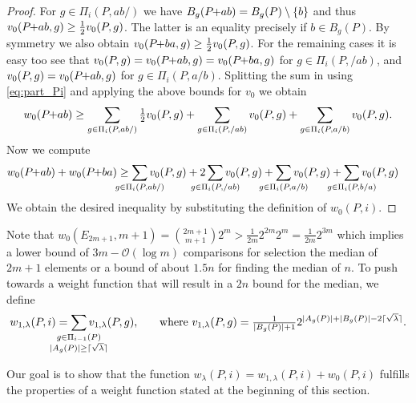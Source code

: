 \documentclass[a4paper,UKenglish,cleveref, autoref, thm-restate]{lipics-v2021}
\newcommand{\pchild}[3]{{#1}\kern-1pt{+}{#2}{#3}}
\begin{document}
\begin{proof}
  For $g \in \Pi_i(P,ab/)$ we have $B_g(\pchild{P}{a}{b}) = B_g(P) \setminus \{ b \}$ and thus $v_0(\pchild{P}{a}{b}, g) \ge \tfrac12 v_0(P, g)$.
  The latter is an equality precisely if $b \in B_g(P)$.
  By symmetry we also obtain $v_0(\pchild{P}{b}{a}, g) \ge \tfrac12 v_0(P, g)$.
  For the remaining cases it is easy too see that $v_0(P, g) = v_0(\pchild{P}{a}{b}, g) = v_0(\pchild{P}{b}{a}, g)$ for $g \in \Pi_i(P,/ab)$, and $v_0(P, g) = v_0(\pchild{P}{a}{b}, g)$ for $g \in \Pi_i(P, a/b)$.
Splitting the sum in  using \cref{eq:part_Pi} and applying the above bounds for $v_0$ we obtain
\begin{equation*}
    w_0(\pchild{P}{a}{b}) \geq \sum_{g \in \Pi_i(P,ab/)} \tfrac12 v_0(P,g) + \sum_{g \in \Pi_i(P,/ab)} v_0(P, g) + \sum_{g \in \Pi_i(P,a/b)} v_0(P, g)\text.
\end{equation*}
Now we compute
  \begin{align*}
    w_0(\pchild{P}{a}{b}) + w_0(\pchild{P}{b}{a}) &\geq \sum_{\mathclap{g \in \Pi_i(P,ab/)}} v_0(P,g) + 2\sum_{\mathclap{g \in \Pi_i(P,/ab)}} v_0(P, g) + \sum_{\mathclap{g \in \Pi_i(P,a/b)}} v_0(P, g) + \sum_{\mathclap{g \in \Pi_i(P,b/a)}} v_0(P, g)
  \end{align*}%
  We obtain the desired inequality by substituting the definition of $w_0(P, i)$.
\end{proof}

Note that $w_0(E_{2m+1}, m+1) = \binom{2m+1}{m+1} 2^{m} > \tfrac{1}{2m}2^{2m}2^m = \tfrac{1}{2m} 2^{3m}$ which implies a lower bound of $3m - \mathcal{O}(\log m)$ comparisons for selection the median of $2m + 1$ elements or a bound of about $1.5n$ for finding the median of $n$.
To push towards a weight function that will result in a $2n$ bound for the median, we define
\begin{equation}\label{eq:def_w1}
w_{1,\lambda}(P, i) = \sum_{\mathclap{\substack{g \in \Pi_{i-1}(P)\\|A_g(P)| \ge \lceil\sqrt {\lambda} \rceil}}} v_{1,\lambda}(P, g)\text{,} \quad\quad\text{where } v_{1,\lambda}(P, g) = \tfrac{1}{|B_g(P)| + 1}2^{|A_g(P)| + |B_g(P)| - 2\lceil\sqrt {\lambda} \rceil}\text.
\end{equation}

Our goal is to show that the function $w_\lambda(P, i) = w_{1,\lambda}(P,i) + w_0(P, i)$ fulfills the properties of a weight function stated at the beginning of this section.
\end{document}
